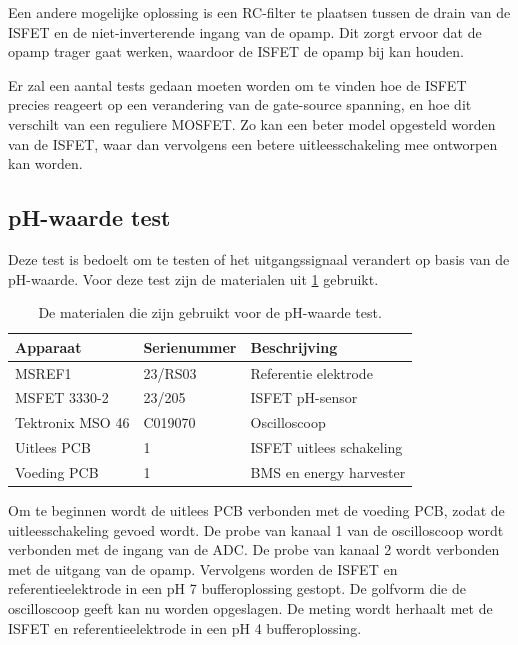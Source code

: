 Een andere mogelijke oplossing is een RC-filter te plaatsen tussen de drain van de ISFET en de niet-inverterende ingang van de opamp. Dit zorgt ervoor dat de opamp trager gaat werken, waardoor de ISFET de opamp bij kan houden.

Er zal een aantal tests gedaan moeten worden om te vinden hoe de ISFET precies reageert op een verandering van de gate-source spanning, en hoe dit verschilt van een reguliere MOSFET. Zo kan een beter model opgesteld worden van de ISFET, waar dan vervolgens een betere uitleesschakeling mee ontworpen kan worden.


\subsection{pH-waarde test} \label{sec:phTest}
Deze test is bedoelt om te testen of het uitgangssignaal verandert op basis van de pH-waarde. Voor deze test zijn de materialen uit \cref{tab:testMaterialen2} gebruikt.
\begin{table}[!htb]
    \centering
    \begin{tabular}{l|l|l}
        Apparaat         & Serienummer & Beschrijving \\
        \hline
        MSREF1           & 23/RS03     & Referentie elektrode       \\
        MSFET 3330-2     & 23/205      & ISFET pH-sensor            \\
        Tektronix MSO 46 & C019070     & Oscilloscoop               \\
        Uitlees PCB      & 1           & ISFET uitlees schakeling   \\
        Voeding PCB      & 1           & BMS en energy harvester    \\
        \hline
    \end{tabular}
    \caption{De materialen die zijn gebruikt voor de pH-waarde test.}
    \label{tab:testMaterialen2}
\end{table}

Om te beginnen wordt de uitlees PCB verbonden met de voeding PCB, zodat de uitleesschakeling gevoed wordt. De probe van kanaal 1 van de oscilloscoop wordt verbonden met de ingang van de ADC. De probe van kanaal 2 wordt verbonden met de uitgang van de opamp. Vervolgens worden de ISFET en referentieelektrode in een pH 7 bufferoplossing gestopt. De golfvorm die de oscilloscoop geeft kan nu worden opgeslagen. De meting wordt herhaalt met de ISFET en referentieelektrode in een pH 4 bufferoplossing.

